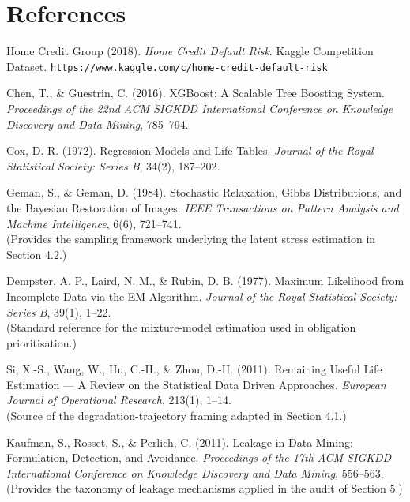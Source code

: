 \documentclass[11pt,a4paper]{article}
\begin{document}
\section{References}

\begin{enumerate}[label={[\arabic*]},leftmargin=2.4em]

\item Home Credit Group (2018). \textit{Home Credit Default Risk}. Kaggle Competition
Dataset. \texttt{https://www.kaggle.com/c/home-credit-default-risk}

\item Chen, T., \& Guestrin, C. (2016). XGBoost: A Scalable Tree Boosting System.
\textit{Proceedings of the 22nd ACM SIGKDD International Conference on Knowledge
Discovery and Data Mining}, 785--794.

\item Cox, D. R. (1972). Regression Models and Life-Tables. \textit{Journal of the Royal
Statistical Society: Series B}, 34(2), 187--202.

\item Geman, S., \& Geman, D. (1984). Stochastic Relaxation, Gibbs Distributions, and the
Bayesian Restoration of Images. \textit{IEEE Transactions on Pattern Analysis and Machine
Intelligence}, 6(6), 721--741.
\\(Provides the sampling framework underlying the latent stress estimation in Section 4.2.)

\item Dempster, A. P., Laird, N. M., \& Rubin, D. B. (1977). Maximum Likelihood from
Incomplete Data via the EM Algorithm. \textit{Journal of the Royal Statistical Society:
Series B}, 39(1), 1--22.
\\(Standard reference for the mixture-model estimation used in obligation prioritisation.)

\item Si, X.-S., Wang, W., Hu, C.-H., \& Zhou, D.-H. (2011). Remaining Useful Life
Estimation --- A Review on the Statistical Data Driven Approaches. \textit{European
Journal of Operational Research}, 213(1), 1--14.
\\(Source of the degradation-trajectory framing adapted in Section 4.1.)

\item Kaufman, S., Rosset, S., \& Perlich, C. (2011). Leakage in Data Mining:
Formulation, Detection, and Avoidance. \textit{Proceedings of the 17th ACM SIGKDD
International Conference on Knowledge Discovery and Data Mining}, 556--563.
\\(Provides the taxonomy of leakage mechanisms applied in the audit of Section 5.)


\end{enumerate}
\end{document}
